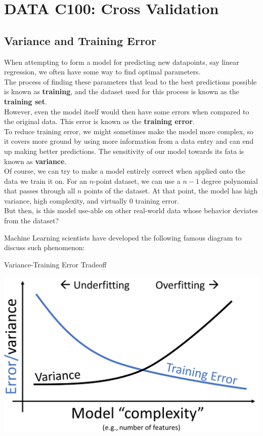 \chapter{DATA C100: Cross Validation}

\section{Variance and Training Error}
When attempting to form a model for predicting new datapoints, say linear regression, we often have some way to find optimal parameters. \\
The process of finding these parameters that lead to the best predictions possible is known as \textbf{training}, and the dataset used for this process is known as the \textbf{training set}.\\
However, even the model itself would then have some errors when compared to the original data. This error is known as the \textbf{training error}. \\
To reduce training error, we might sometimes make the model more complex, so it covers more ground by using more information from a data entry and can end up making better predictions. The sensitivity of our model towards its fata is known as \textbf{variance}. \\
Of course, we can try to make a model entirely correct when applied onto the data we train it on. For an $n$-point dataset, we can use a $n-1$ degree polynomial that passes through all $n$ points of the dataset. At that point, the model has high variance, high complexity, and virtually $0$ training error. \\
But then, is this model use-able on other real-world data whose behavior deviates from the dataset?

Machine Learning scientists have developed the following famous diagram to discuss such phenomenon:
\begin{ln-fig}{Variance-Training Error Tradeoff}{}
    \begin{center}
        \includegraphics[scale=0.4]{figs/ln06/var-train-err-tradeoff.png}
    \end{center}
\end{ln-fig}

